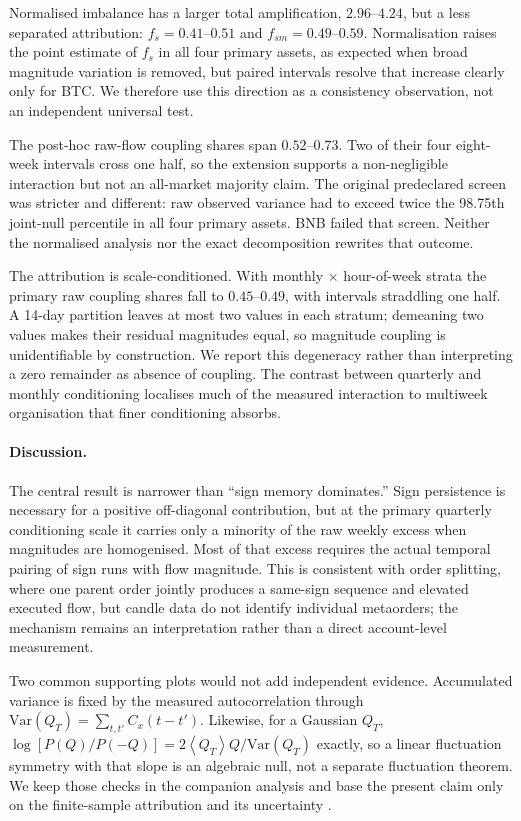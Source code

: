 \documentclass[aps,prl,twocolumn,superscriptaddress,floatfix,nofootinbib]{revtex4-2}
\newcommand{\avg}[1]{\left\langle #1 \right\rangle}
\newcommand{\Var}{\mathrm{Var}}
\begin{document}
Normalised imbalance has a larger total amplification, $2.96$--$4.24$, but a
less separated attribution: $f_s=0.41$--$0.51$ and
$f_{sm}=0.49$--$0.59$.  Normalisation raises the point estimate of $f_s$ in all
four primary assets, as expected when broad magnitude variation is removed,
but paired intervals resolve that increase clearly only for BTC.  We therefore
use this direction as a consistency observation, not an independent universal
test.

The post-hoc raw-flow coupling shares span $0.52$--$0.73$.  Two of their four
eight-week intervals cross one half, so the extension supports a non-negligible
interaction but not an all-market majority claim.  The original predeclared
screen was stricter and different: raw observed variance had to exceed twice
the 98.75th joint-null percentile in all four primary assets.  BNB failed that
screen.  Neither the normalised analysis nor the exact decomposition rewrites
that outcome.

The attribution is scale-conditioned.  With monthly $\times$ hour-of-week
strata the primary raw coupling shares fall to $0.45$--$0.49$, with intervals
straddling one half.  A 14-day partition leaves at most two values in each
stratum; demeaning two values makes their residual magnitudes equal, so
magnitude coupling is unidentifiable by construction.  We report this
degeneracy rather than interpreting a zero remainder as absence of coupling.
The contrast between quarterly and monthly conditioning localises much of the
measured interaction to multiweek organisation that finer conditioning absorbs.

\paragraph*{Discussion.}
The central result is narrower than ``sign memory dominates.''  Sign
persistence is necessary for a positive off-diagonal contribution, but at the
primary quarterly conditioning scale it carries only a minority of the raw
weekly excess when magnitudes are homogenised.  Most of that excess requires
the actual temporal pairing of sign runs with flow magnitude.  This is
consistent with order splitting, where one parent order jointly produces a
same-sign sequence and elevated executed flow, but candle data do not identify
individual metaorders; the mechanism remains an interpretation rather than a
direct account-level measurement.

Two common supporting plots would not add independent evidence.  Accumulated
variance is fixed by the measured autocorrelation through
$\Var(Q_T)=\sum_{t,t'}C_x(t-t')$.  Likewise, for a Gaussian $Q_T$,
$\log[P(Q)/P(-Q)]=2\avg{Q_T}Q/\Var(Q_T)$ exactly, so a linear fluctuation
symmetry with that slope is an algebraic null, not a separate fluctuation
theorem.  We keep those checks in the companion analysis and base the present
claim only on the finite-sample attribution and its uncertainty
\cite{combined_pre}.
\end{document}
